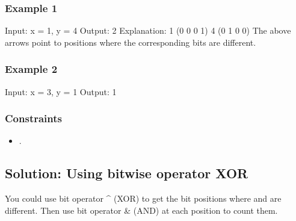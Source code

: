 \documentclass[letterpaper,12pt,english]{book}
\begin{document}
\subsubsection{Example 1}
\label{\detokenize{Mathematics/09_MTH_461_Hamming_Distance:example-1}}
\begin{sphinxVerbatim}[commandchars=\\\{\}]
Input: x = 1, y = 4
Output: 2
Explanation:
1   (0 0 0 1)
4   (0 1 0 0)
       \PYGZca{}   \PYGZca{}
The above arrows point to positions where the corresponding bits are different.
\end{sphinxVerbatim}


\subsubsection{Example 2}
\label{\detokenize{Mathematics/09_MTH_461_Hamming_Distance:example-2}}
\begin{sphinxVerbatim}[commandchars=\\\{\}]
Input: x = 3, y = 1
Output: 1
\end{sphinxVerbatim}


\subsubsection{Constraints}
\label{\detokenize{Mathematics/09_MTH_461_Hamming_Distance:constraints}}\begin{itemize}
\item {} 
\sphinxAtStartPar
{}.

\end{itemize}


\subsection{Solution: Using bitwise operator XOR}
\label{\detokenize{Mathematics/09_MTH_461_Hamming_Distance:solution-using-bitwise-operator-xor}}
\sphinxAtStartPar
You could use bit operator \textasciicircum{} (XOR) to get the bit positions where  and  are different. Then use bit operator \& (AND) at each position to count them.
\end{document}
